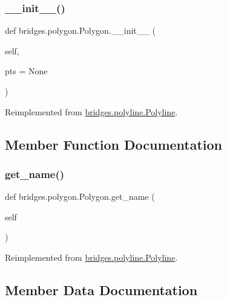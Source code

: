 \subsubsection{\texorpdfstring{\_\_init\_\_()}{\_\_init\_\_()}}
{\footnotesize\ttfamily def bridges.\+polygon.\+Polygon.\+\_\+\+\_\+init\+\_\+\+\_\+ (\begin{DoxyParamCaption}\item[{}]{self,  }\item[{}]{pts = {\ttfamily None} }\end{DoxyParamCaption})}



Reimplemented from \mbox{\hyperlink{classbridges_1_1polyline_1_1_polyline_a536cf599bc221283c8e8d6df2324f23e}{bridges.\+polyline.\+Polyline}}.



\subsection{Member Function Documentation}
\mbox{\label{classbridges_1_1polygon_1_1_polygon_afa0d94f62a19b24ad3764bc900718346}} 
\subsubsection{\texorpdfstring{get\_name()}{get\_name()}}
{\footnotesize\ttfamily def bridges.\+polygon.\+Polygon.\+get\+\_\+name (\begin{DoxyParamCaption}\item[{}]{self }\end{DoxyParamCaption})}



Reimplemented from \mbox{\hyperlink{classbridges_1_1polyline_1_1_polyline_ac29d5a9cfe5fd60d97a32adef3a6b6bc}{bridges.\+polyline.\+Polyline}}.



\subsection{Member Data Documentation}
\mbox{\label{classbridges_1_1polygon_1_1_polygon_ae9c67cb9337ec5deebf1e334e84b3635}} 
